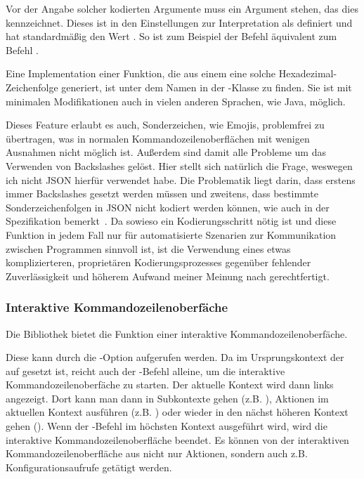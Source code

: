 Vor der Angabe solcher kodierten Argumente muss ein Argument stehen, das dies kennzeichnet.
Dieses ist in den Einstellungen zur Interpretation als  definiert und hat standardmäßig den Wert .
So ist zum Beispiel der Befehl  äquivalent zum Befehl .

Eine Implementation einer Funktion, die aus einem  eine solche Hexadezimal-Zeichenfolge generiert, ist unter dem Namen  in der -Klasse zu finden.
Sie ist mit minimalen Modifikationen auch in vielen anderen Sprachen, wie Java, möglich.

Dieses Feature erlaubt es auch, Sonderzeichen, wie Emojis, problemfrei zu übertragen, was in normalen Kommandozeilenoberflächen mit wenigen Ausnahmen nicht möglich ist.
Außerdem sind damit alle Probleme um das Verwenden von Backslashes gelöst.
Hier stellt sich natürlich die Frage, weswegen ich nicht JSON hierfür verwendet habe.
Die Problematik liegt darin, dass erstens immer Backslashes gesetzt werden müssen und  zweitens, dass bestimmte Sonderzeichenfolgen in JSON nicht kodiert werden können, wie auch in der Spezifikation bemerkt~\cite{JSONSpec}.
Da sowieso ein Kodierungsschritt nötig ist und diese Funktion in jedem Fall nur für automatisierte Szenarien zur Kommunikation zwischen Programmen sinnvoll ist,
ist die Verwendung eines etwas komplizierteren, proprietären Kodierungsprozesses gegenüber fehlender Zuverlässigkeit und höherem Aufwand meiner Meinung nach gerechtfertigt.
\subsubsection{Interaktive Kommandozeilenoberfäche}
Die Bibliothek bietet die Funktion einer interaktive Kommandozeilenoberfäche.

Diese kann durch die -Option aufgerufen werden.
Da im Ursprungskontext der  auf  gesetzt ist,
reicht auch der -Befehl alleine, um die interaktive Kommandozeilenoberfäche zu starten.
Der aktuelle Kontext wird dann links angezeigt.
Dort kann man dann in Subkontexte gehen (z.B. ), Aktionen im aktuellen Kontext ausführen (z.B. )
oder wieder in den nächst höheren Kontext gehen ().
Wenn der -Befehl im höchsten Kontext ausgeführt wird, wird die interaktive Kommandozeilenoberfläche beendet.
Es können von der interaktiven Kommandozeilenoberfläche aus nicht nur Aktionen, sondern auch z.B. Konfigurationsaufrufe getätigt werden.
